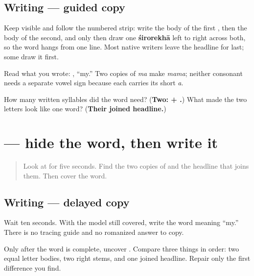 \subsection*{Writing — guided copy}

Keep \textbf{} visible and follow the numbered strip: write the body of the first \textbf{}, then the body of the second, and only then draw one \textbf{śirorekhā} left to right across both, so the word hangs from one line. Most native writers leave the headline for last; some draw it first.

Read what you wrote: \textbf{}, “my.” Two copies of \emph{ma} make \emph{mama}; neither consonant needs a separate vowel sign because each carries its short \emph{a}.

\begin{tcolorbox}[breakable,colback=teal!4,colframe=teal!35!black,title={Before you move on}]
How many written syllables did the word need? (\textbf{Two:  + .}) What made the two letters look like one word? (\textbf{Their joined headline.})
\end{tcolorbox}
\section[\texorpdfstring{\sk{मम} (mama)}{मम (mama)}]{ — hide the word, then write it}

\label{lesson:SA-W03-mama-delayed-copy}



\begin{quote}
Look at \textbf{} for five seconds. Find the two copies of \textbf{} and the headline that joins them. Then cover the word.
\end{quote}

\subsection*{Writing — delayed copy}

Wait ten seconds. With the model still covered, write the word meaning “my.” There is no tracing guide and no romanized answer to copy.

Only after the word is complete, uncover \textbf{}. Compare three things in order: two equal letter bodies, two right stems, and one joined headline. Repair only the first difference you find.

